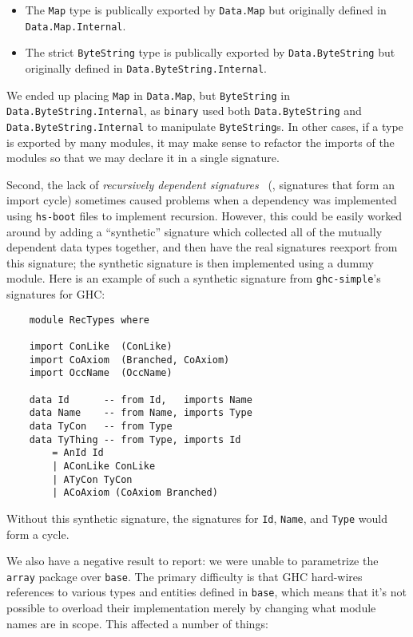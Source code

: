\begin{itemize}
    \item The \verb|Map| type is publically exported by \verb|Data.Map|
    but originally defined in \verb|Data.Map.Internal|.

    \item The strict \verb|ByteString| type is publically exported by
    \verb|Data.ByteString| but originally defined in
    \verb|Data.ByteString.Internal|.
\end{itemize}
%
We ended up placing \verb|Map| in \verb|Data.Map|,
but \verb|ByteString| in \verb|Data.ByteString.Internal|, as
\verb|binary| used both \verb|Data.ByteString| and \verb|Data.ByteString.Internal|
to manipulate \verb|ByteString|s.  In other cases, if a type is exported by
many modules, it may make sense to refactor the imports of the modules
so that we may declare it in a single signature.

Second, the lack of
\emph{recursively dependent signatures}~\cite{crary+:recmod-pldi}
(\ie, signatures that form an import cycle)
sometimes caused problems when a
dependency was implemented using \texttt{hs-boot} files to implement
recursion.  However, this could be easily worked around by adding
a ``synthetic'' signature which collected all of the mutually dependent
data types together, and then have the real signatures reexport
from this signature;  the synthetic signature is then implemented using
a dummy module.  Here is an example of such a synthetic signature
from \texttt{ghc-simple}'s signatures for GHC\@:

\begin{verbatim}
    module RecTypes where

    import ConLike  (ConLike)
    import CoAxiom  (Branched, CoAxiom)
    import OccName  (OccName)

    data Id      -- from Id,   imports Name
    data Name    -- from Name, imports Type
    data TyCon   -- from Type
    data TyThing -- from Type, imports Id
        = AnId Id
        | AConLike ConLike
        | ATyCon TyCon
        | ACoAxiom (CoAxiom Branched)
\end{verbatim}
Without this synthetic signature, the signatures for \texttt{Id}, \texttt{Name},
and \texttt{Type} would form a cycle.

We also have a negative result to report: we were unable to parametrize
the \verb|array| package over \verb|base|.  The primary difficulty is
that GHC hard-wires references to various types and entities defined in
\verb|base|, which means that it's not possible to overload their
implementation merely by changing what module names are in scope.  This
affected a number of things:

